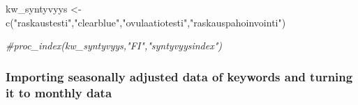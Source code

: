 \documentclass[
]{article}
\newenvironment{Shaded}{\begin{snugshade}}{\end{snugshade}}
\newcommand{\CommentTok}[1]{\textcolor[rgb]{0.56,0.35,0.01}{\textit{#1}}}
\newcommand{\FunctionTok}[1]{\textcolor[rgb]{0.00,0.00,0.00}{#1}}
\newcommand{\NormalTok}[1]{#1}
\newcommand{\OtherTok}[1]{\textcolor[rgb]{0.56,0.35,0.01}{#1}}
\newcommand{\StringTok}[1]{\textcolor[rgb]{0.31,0.60,0.02}{#1}}
\begin{document}
\begin{Shaded}
\begin{Highlighting}[]
\NormalTok{kw\_syntyvyys }\OtherTok{\textless{}{-}} \FunctionTok{c}\NormalTok{(}\StringTok{"raskaustesti"}\NormalTok{,}\StringTok{"clearblue"}\NormalTok{,}\StringTok{"ovulaatiotesti"}\NormalTok{,}\StringTok{"raskauspahoinvointi"}\NormalTok{)}

\CommentTok{\#proc\_index(kw\_syntyvyys,"FI","syntyvyysindex")}
\end{Highlighting}
\end{Shaded}

\hypertarget{importing-seasonally-adjusted-data-of-keywords-and-turning-it-to-monthly-data}{%
\subsubsection{Importing seasonally adjusted data of keywords and
turning it to monthly
data}\label{importing-seasonally-adjusted-data-of-keywords-and-turning-it-to-monthly-data}}
\end{document}
